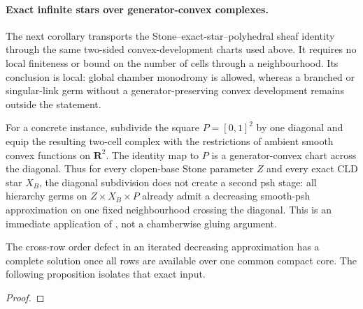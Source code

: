 


\paragraph{Exact infinite stars over generator-convex complexes.}
The next corollary transports the Stone--exact-star--polyhedral sheaf
identity through the same two-sided convex-development charts used above.
It requires no local finiteness or bound on the number of cells through a
neighbourhood.  Its conclusion is local: global chamber monodromy is
allowed, whereas a branched or singular-link germ without a
generator-preserving convex development remains outside the statement.




For a concrete instance, subdivide the square
$P=[0,1]^2$ by one diagonal and equip the resulting two-cell complex with
the restrictions of ambient smooth convex functions on $\mathbf R^2$.
The identity map to $P$ is a generator-convex chart across the diagonal.
Thus for every clopen-base Stone parameter $Z$ and every exact CLD star
$X_B$, the diagonal subdivision does not create a second psh stage: all
hierarchy germs on $Z\times X_B\times P$ already admit a decreasing
smooth-psh approximation on one fixed neighbourhood crossing the diagonal.
This is an immediate application of
, not a
chamberwise gluing argument.

The cross-row order defect in an iterated decreasing approximation has a
complete solution once all rows are available over one common compact core.
The following proposition isolates that exact input.

\begin{proposition}
\label{prop:p071-fixed-core-flattening}

\end{proposition}

\begin{proof}

\end{proof}

